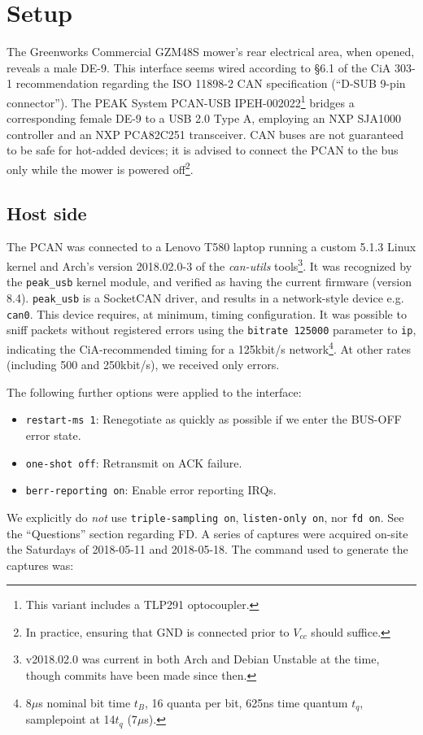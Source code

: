 \documentclass[letterpaper,10pt]{article}
\begin{document}
\section{Setup}
The Greenworks Commercial GZM48S mower's
rear electrical area, when opened, reveals a male DE-9. This interface seems
wired according to \S6.1 of the CiA 303-1\parencite{cia3031} recommendation regarding
the ISO 11898-2\parencite{iso118982} CAN specification (``D-SUB 9-pin connector'').
The PEAK System PCAN-USB\parencite{pcan} IPEH-002022\footnote{This variant
includes a TLP291 optocoupler.} bridges a corresponding
female DE-9 to a USB 2.0 Type A, employing an NXP SJA1000\parencite{sja1000}
controller and an NXP PCA82C251\parencite{pca82c251} transceiver.
CAN buses are not guaranteed to be safe for hot-added
devices; it is advised to connect the PCAN to the bus only while the mower is
powered off\footnote{In practice, ensuring that GND is connected prior to
$V_{cc}$ should suffice.}.

\subsection{Host side}
The PCAN was connected to a Lenovo T580 laptop running a custom 5.1.3 Linux
kernel and Arch's version 2018.02.0-3 of the \textit{can-utils}\parencite{canutils}
tools\footnote{v2018.02.0 was current in both Arch and Debian Unstable at the time,
though commits have been made since then.}. It was recognized by the \texttt{peak\_usb}
kernel module, and verified as having the current firmware (version 8.4).
\texttt{peak\_usb} is a SocketCAN driver, and results in a network-style
device e.g. \texttt{can0}. This device requires, at minimum, timing
configuration. It was possible to sniff packets without registered errors using
the \texttt{bitrate 125000} parameter to \texttt{ip}, indicating the
CiA-recommended timing\parencite{canbittiming} for a 125kbit/s network\footnote{8$\mu$s nominal bit
time $t_B$, 16 quanta per bit, 625ns time quantum $t_q$, samplepoint at 14$t_q$
(7$\mu$s).}. At other rates (including 500 and 250kbit/s), we received only errors.

The following further options were applied to the interface:
\begin{itemize}
\item \texttt{restart-ms 1}: Renegotiate as quickly as possible if we enter
  the BUS-OFF error state.
\item \texttt{one-shot off}: Retransmit on ACK failure.
\item \texttt{berr-reporting on}: Enable error reporting IRQs.
\end{itemize}
We explicitly do \textit{not} use \texttt{triple-sampling on},
\texttt{listen-only on}, nor \texttt{fd on}. See the ``Questions'' section
regarding FD. A series of captures were acquired on-site the Saturdays of
2018-05-11 and 2018-05-18. The command used to generate the captures was:\\
\end{document}
